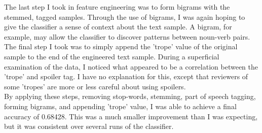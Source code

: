 \documentclass[11pt, oneside]{article}   	%
\begin{document}
\indent The last step I took in feature engineering was to form bigrams with the stemmed, tagged samples.  Through the use of bigrams, I was again hoping to give the classifier a sense of context about the text sample.  A bigram, for example, may allow the classifier to discover patterns between noun-verb pairs.\\
\indent The final step I took was to simply append the 'trope' value of the original sample to the end of the engineered text sample.  During a superficial examination of the data, I noticed what appeared to be a correlation between the 'trope' and spoiler tag.  I have no explanation for this, except that reviewers of some 'tropes' are more or less careful about using spoilers.\\
\indent By applying these steps, removing stop-words, stemming, part of speech tagging, forming bigrams, and appending 'trope' value, I was able to achieve a final accuracy of 0.68428.  This was a much smaller improvement than I was expecting, but it was consistent over several runs of the classifier.\\
\end{document}
